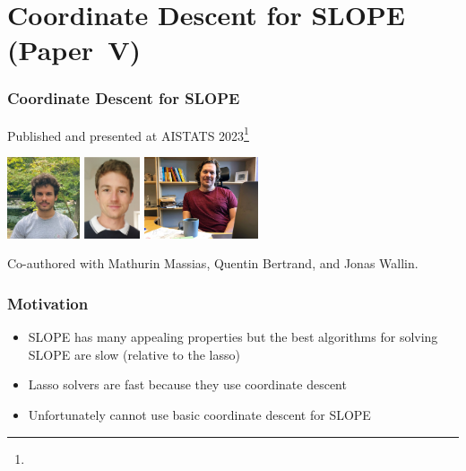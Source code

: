 \documentclass[10pt]{beamer}
\begin{document}
\section{Coordinate Descent for SLOPE (Paper~V)}

\begin{frame}[c]
  \frametitle{Coordinate Descent for SLOPE}

  Published and presented at AISTATS 2023\footnote{}

  \begin{center}
    \hfill%
    \includegraphics[height=2.4cm]{figures/mathurin.jpg}\hfill%
    \includegraphics[height=2.4cm]{figures/quentin.png}\hfill%
    \includegraphics[height=2.4cm]{figures/jonas.jpg}\hfill\null
  \end{center}

  Co-authored with Mathurin Massias, Quentin Bertrand, and Jonas Wallin.

\end{frame}

\begin{frame}[c]
  \frametitle{Motivation}

  \begin{itemize}[<+->]
    \item SLOPE has many appealing properties but the best algorithms for solving SLOPE are slow
          (relative to the lasso)
    \item Lasso solvers are fast because they use coordinate descent
    \item Unfortunately cannot use basic coordinate descent for SLOPE
  \end{itemize}
\end{frame}
\end{document}
